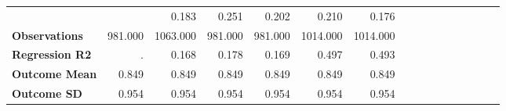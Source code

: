 \begin{tabular}{@{\extracolsep{5pt}}lrrrrrrrrrrrrrrr}
{\bf } & \phantom{***} & 0.183\phantom{\phantom{)}***} & 0.251\phantom{\phantom{)}***} & 0.202\phantom{\phantom{)}***} & 0.210\phantom{\phantom{)}***} & 0.176\phantom{\phantom{)}***} \\
{\bf Observations} & 981.000\phantom{\phantom{)}***} & 1063.000\phantom{\phantom{)}***} & 981.000\phantom{\phantom{)}***} & 981.000\phantom{\phantom{)}***} & 1014.000\phantom{\phantom{)}***} & 1014.000\phantom{\phantom{)}***} \\
{\bf Regression R2} & .\phantom{***} & 0.168\phantom{***} & 0.178\phantom{***} & 0.169\phantom{***} & 0.497\phantom{***} & 0.493\phantom{***} \\
{\bf Outcome Mean} & 0.849\phantom{***} & 0.849\phantom{***} & 0.849\phantom{***} & 0.849\phantom{***} & 0.849\phantom{***} & 0.849\phantom{***} \\
{\bf Outcome SD} & 0.954\phantom{***} & 0.954\phantom{***} & 0.954\phantom{***} & 0.954\phantom{***} & 0.954\phantom{***} & 0.954\phantom{***} \\
\hline
\end{tabular}
